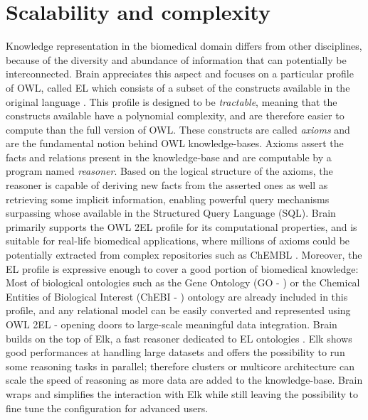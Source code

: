\documentclass{bioinfo}
\begin{document}
\section{Scalability and complexity}
Knowledge representation in the biomedical domain differs from other disciplines, because of the diversity and abundance of
information that can potentially be interconnected. Brain appreciates this aspect and focuses on a particular profile of OWL, called EL
which consists of a subset of the constructs available in the original language \citep{Motik2009}. This profile is
designed to be \emph{tractable}, meaning that the constructs available have a polynomial complexity, 
and are therefore easier to compute than the full 
version of OWL. 
These constructs are called \emph{axioms} and are the fundamental notion behind OWL knowledge-bases.
Axioms assert the facts and relations present in the knowledge-base and are computable by a program named \emph{reasoner}. 
Based on the logical structure of the axioms, the reasoner is capable of deriving new facts from the asserted ones as well as retrieving
some implicit information, enabling powerful query mechanisms surpassing whose available in the Structured Query Language (SQL). 
Brain primarily supports the OWL 2EL profile for its computational properties, and is suitable for real-life biomedical applications, 
where millions of axioms could be potentially extracted from complex repositories such as ChEMBL \citep{Gaulton2012}.
Moreover, the EL profile is expressive enough to cover a good portion of biomedical knowledge: Most of biological ontologies such as 
the Gene Ontology (GO - \citealp{Ashburner2000}) or 
the Chemical Entities of Biological Interest (ChEBI - \citealp{DeMatos2010}) ontology are already included in this 
profile, and any relational model can be easily 
converted and represented using OWL 2EL - opening doors to large-scale meaningful data integration.
Brain builds on the top of Elk, a fast reasoner dedicated to EL ontologies \citep{YevgenyKazakov2011}. Elk shows good 
performances at handling 
large datasets and offers the possibility to run some reasoning tasks in parallel; therefore
clusters or multicore architecture can scale the speed of reasoning as more data are added to the knowledge-base.
Brain wraps and simplifies the interaction with Elk while still leaving the possibility to fine tune 
the configuration for advanced users.
\end{document}
